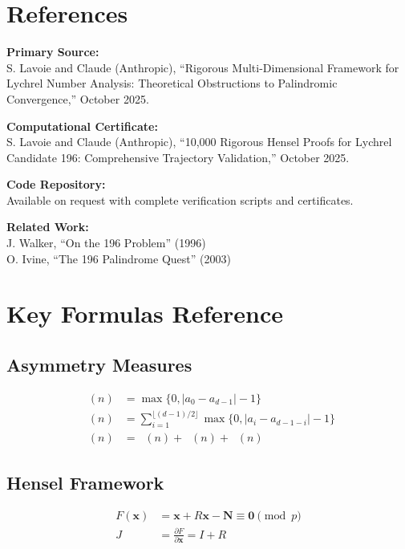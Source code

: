 \documentclass[11pt,a4paper]{article}
\theoremstyle{plain}
\theoremstyle{definition}
\DeclareMathOperator{\Aext}{A^{\text{(ext)}}}
\DeclareMathOperator{\Aint}{A^{\text{(int)}}}
\DeclareMathOperator{\Acarry}{A^{\text{(carry)}}}
\DeclareMathOperator{\Arobust}{A^{\text{(robust)}}}
\begin{document}
\section{References}

\raggedright
\textbf{Primary Source:} \\
S. Lavoie and Claude (Anthropic), ``Rigorous Multi-Dimensional Framework for Lychrel Number Analysis: Theoretical Obstructions to Palindromic Convergence,'' October 2025.

\textbf{Computational Certificate:} \\
S. Lavoie and Claude (Anthropic), ``10,000 Rigorous Hensel Proofs for Lychrel Candidate 196: Comprehensive Trajectory Validation,'' October 2025.

\textbf{Code Repository:} \\
Available on request with complete verification scripts and certificates.

\textbf{Related Work:} \\
J. Walker, ``On the 196 Problem'' (1996) \\
O. Ivine, ``The 196 Palindrome Quest'' (2003)

\appendix

\section{Key Formulas Reference}

\subsection{Asymmetry Measures}
\begin{align}
\Aext(n) &= \max\{0, |a_0 - a_{d-1}| - 1\} \\
\Aint(n) &= \sum_{i=1}^{\lfloor (d-1)/2 \rfloor} \max\{0, |a_i - a_{d-1-i}| - 1\} \\
\Arobust(n) &= \Aext(n) + \Aint(n) + \Acarry(n)
\end{align}

\subsection{Hensel Framework}
\begin{align}
F(\mathbf{x}) &= \mathbf{x} + R\mathbf{x} - \mathbf{N} \equiv \mathbf{0} \pmod{p} \\
J &= \frac{\partial F}{\partial \mathbf{x}} = I + R
\end{align}
\end{document}
